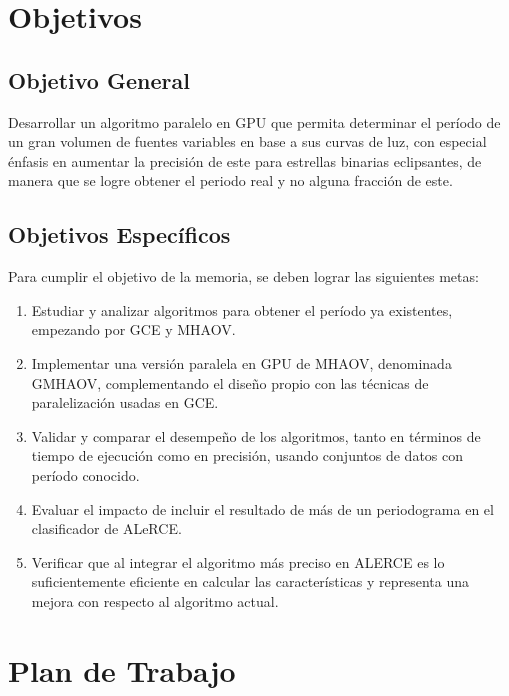 \section{Objetivos}\label{sec:objetivos}

  \subsection*{Objetivo General}\label{sec:obj-g}
  Desarrollar un algoritmo paralelo en GPU que permita determinar el período de un gran volumen de fuentes variables en base a sus curvas de luz, con especial énfasis en aumentar la precisión de este para estrellas binarias eclipsantes, de manera que se logre obtener el periodo real y no alguna fracción de este.

  \subsection*{Objetivos Específicos}\label{sec:obj-e}
  Para cumplir el objetivo de la memoria, se deben lograr las siguientes metas:
  \begin{enumerate}
  \item Estudiar y analizar algoritmos para obtener el período ya existentes, empezando por GCE y MHAOV.
  \item Implementar una versión paralela en GPU de MHAOV, denominada GMHAOV, complementando el diseño propio con las técnicas de paralelización usadas en GCE.
  \item Validar y comparar el desempeño de los algoritmos, tanto en términos de tiempo de ejecución como en precisión, usando conjuntos de datos con período conocido.
  \item Evaluar el impacto de incluir el resultado de más de un periodograma  en el clasificador de ALeRCE.
  \item Verificar que al integrar el algoritmo más preciso  en ALERCE es lo suficientemente eficiente en calcular las características y representa una mejora con respecto al algoritmo actual.

  \end{enumerate}
\section{Plan de Trabajo}\label{chap:sol}

